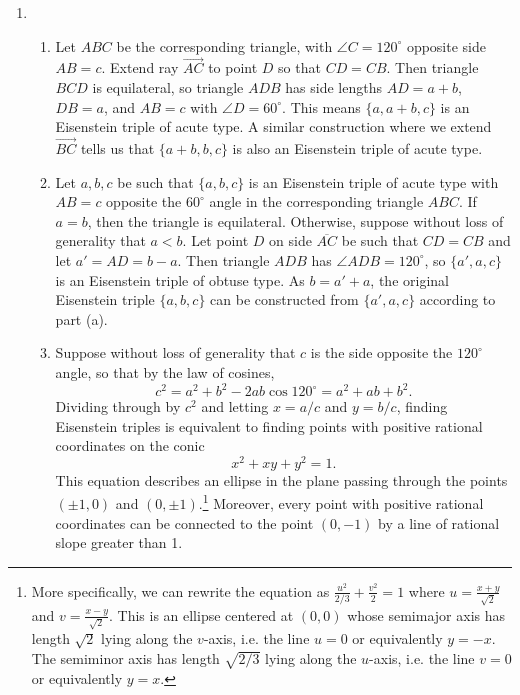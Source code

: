 \begin{enumerate}
\item \begin{enumerate}
\item Let $ABC$ be the corresponding triangle, with $\angle C = 120^{\circ}$ opposite side $AB = c$. Extend ray $\overrightarrow{AC}$ to point $D$ so that $CD = CB$. Then triangle $BCD$ is equilateral, so triangle $ADB$ has side lengths $AD = a + b$, $DB = a$, and $AB = c$ with $\angle D = 60^{\circ}$. This means $\{a, a + b, c\}$ is an Eisenstein triple of acute type. A similar construction where we extend $\overrightarrow{BC}$ tells us that $\{a + b, b, c\}$ is also an Eisenstein triple of acute type.
\item Let $a,b,c$ be such that $\{a,b,c\}$ is an Eisenstein triple of acute type with $AB = c$ opposite the $60^{\circ}$ angle in the corresponding triangle $ABC$. If $a = b$, then the triangle is equilateral. Otherwise, suppose without loss of generality that $a < b$. Let point $D$ on side $\overline{AC}$ be such that $CD = CB$ and let $a' = AD = b - a$. Then triangle $ADB$ has $\angle ADB = 120^{\circ}$, so $\{a', a, c\}$ is an Eisenstein triple of obtuse type. As $b = a' + a$, the original Eisenstein triple $\{a,b,c\}$ can be constructed from $\{a', a, c\}$ according to part (a).
\item Suppose without loss of generality that $c$ is the side opposite the $120^{\circ}$ angle, so that by the law of cosines,
\begin{equation*}
c^2 = a^2 + b^2 - 2ab\cos 120^{\circ} = a^2 + ab + b^2.
\end{equation*}
Dividing through by $c^2$ and letting $x = a/c$ and $y = b/c$, finding Eisenstein triples is equivalent to finding points with positive rational coordinates on the conic
\begin{equation*}
x^2 + xy + y^2 = 1.
\end{equation*}
This equation describes an ellipse in the plane passing through the points $(\pm 1, 0)$ and $(0, \pm 1)$.\footnote{More specifically, we can rewrite the equation as $\frac{u^2}{2/3} + \frac{v^2}{2} = 1$ where $u = \frac{x + y}{\sqrt{2}}$ and $v = \frac{x - y}{\sqrt{2}}$. This is an ellipse centered at $(0,0)$ whose semimajor axis has length $\sqrt{2}$ lying along the $v$-axis, i.e. the line $u = 0$ or equivalently $y = -x$. The semiminor axis has length $\sqrt{2/3}$ lying along the $u$-axis, i.e. the line $v = 0$ or equivalently $y = x$.} Moreover, every point with positive rational coordinates can be connected to the point $(0,-1)$ by a line of rational slope greater than 1.\par

\end{enumerate}
\end{enumerate}
